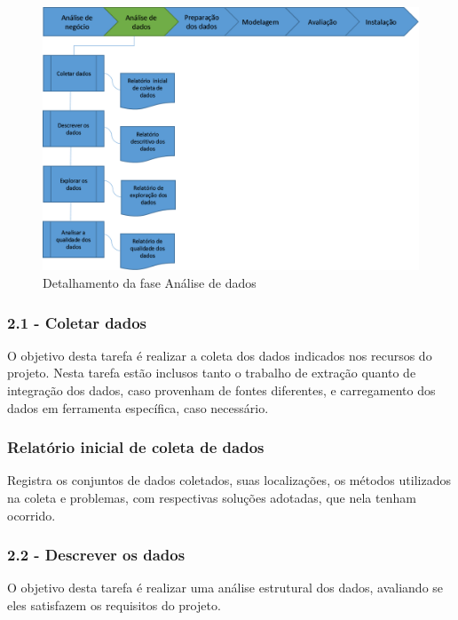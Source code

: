 \begin{figure}[H]
	\includegraphics[scale=0.8]{img/CRISP-DM-Analise-dos-dados.png}
	\caption{Detalhamento da fase Análise de dados}
	\label{img:CRISP-DM-Analise-de-dados}
\end{figure}


\subsubsection*{\textbf{2.1 - Coletar dados}}

O objetivo desta tarefa é realizar a coleta dos dados indicados nos recursos do projeto. Nesta tarefa estão inclusos tanto o trabalho de extração quanto de integração dos dados, caso provenham de fontes diferentes, e carregamento dos dados em ferramenta específica, caso necessário.

\subsubsection*{Relatório inicial de coleta de dados}

Registra os conjuntos de dados coletados, suas localizações, os métodos utilizados na coleta e problemas, com respectivas soluções adotadas, que nela tenham ocorrido.

\subsubsection*{\textbf{2.2 - Descrever os dados}}

O objetivo desta tarefa é realizar uma análise estrutural dos dados, avaliando se eles satisfazem os requisitos do projeto.

